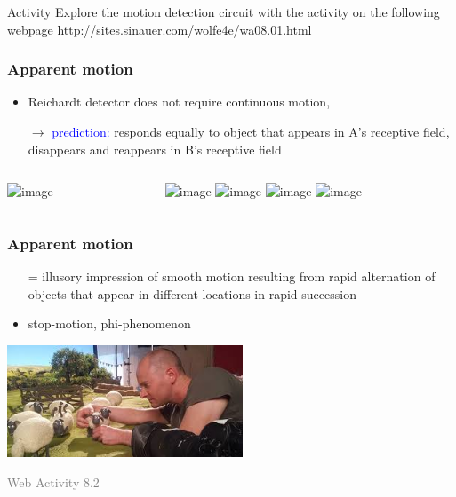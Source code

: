 \documentclass[]{beamer}
\begin{document}
\begin{frame}
\begin{block}{Activity}
Explore the motion detection circuit with the activity on the following webpage \url{http://sites.sinauer.com/wolfe4e/wa08.01.html}
\end{block}
\end{frame}



\begin{frame}
 \frametitle{Apparent motion}
 \begin{overlayarea}{110mm}{80mm}
\begin{itemize}
   \item Reichardt detector does not require continuous motion,
   \item[$\rightarrow$]\textcolor{blue}{prediction:} responds equally to object that appears in A's receptive field, disappears and reappears in B's receptive field
\end{itemize}

\begin{columns}[T]
 \begin{column}{40mm}
\includegraphics<1->[width=30mm]{figs/l7/reichardt_detector_single.png}
 \end{column}

 \begin{column}{40mm}
\begin{center}
\includegraphics<2>[width=40mm]{figs/l7/daumenkino_daffy_1.png} 
\includegraphics<3>[width=40mm]{figs/l7/daumenkino_daffy_2.png} 
\includegraphics<4>[width=40mm]{figs/l7/daumenkino_daffy_3.png} 
\includegraphics<5>[width=40mm]{figs/l7/daumenkino_daffy_4.png} 
\end{center}
\end{column}
\end{columns}
\end{overlayarea}
\end{frame}


\begin{frame}
\frametitle{Apparent motion}
 \begin{overlayarea}{110mm}{80mm}
 \begin{itemize}
 \item[=] illusory impression of smooth motion resulting from rapid alternation of objects that appear in different locations in rapid succession
 \item stop-motion, phi-phenomenon
\end{itemize}
\begin{center}
\includegraphics[width=70mm]{figs/l7/filming_shaun2.jpg} 
\end{center}

 {\vspace{3mm}\textcolor{gray}{Web Activity 8.2}}
\end{overlayarea}
\end{frame}
\end{document}
